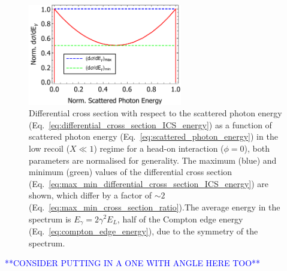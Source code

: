 \documentclass[../main.tex]{subfiles}
\begin{document}
\begin{figure}[!h]
\centering
\includegraphics[width=0.6\textwidth]{Figures/Photon_Production_by_Inverse_Compton_Scattering/Cross_Section_Scattered_Photon_Energy.pdf}
\caption{Differential cross section with respect to the scattered photon energy (Eq.~\ref{eq:differential_cross_section_ICS_energy}) as a function of scattered photon energy (Eq.~\ref{eq:scattered_photon_energy}) in the low recoil ($X \ll 1$) regime for a head-on interaction ($\phi=0$), both parameters are normalised for generality. The maximum (blue) and minimum (green) values of the differential cross section (Eq.~\ref{eq:max_min_differential_cross_section_ICS_energy}) are shown, which differ by a factor of $\sim2$ (Eq.~\ref{eq:max_min_cross_section_ratio}).The average energy in the spectrum is $E_{\gamma}=2\gamma^{2}E_{L}$, half of the Compton edge energy (Eq.~\ref{eq:compton_edge_energy}), due to the symmetry of the spectrum.}
\label{fig:cross_section_scattered_photon_energy}
\end{figure}
\textcolor{blue}{**CONSIDER PUTTING IN A ONE WITH ANGLE HERE TOO**}
\end{document}
